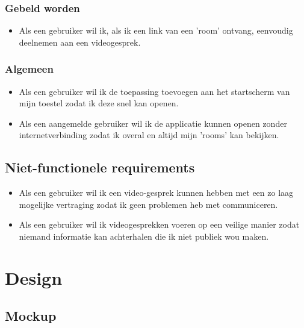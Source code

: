 	 	\subsubsection{Gebeld worden}
	 	 \begin{itemize}
				\item Als een gebruiker wil ik, als ik een link van een 'room' ontvang, eenvoudig deelnemen aan een videogesprek.
	 	 \end{itemize}
	
		\subsubsection{Algemeen}
	 		\begin{itemize}
	 			\item Als een gebruiker wil ik de toepassing toevoegen aan het startscherm van mijn toestel zodat ik deze snel kan openen.
	 			\item Als een aangemelde gebruiker wil ik de applicatie kunnen openen zonder internetverbinding zodat ik overal en altijd mijn 'rooms' kan bekijken.
			\end{itemize}
	 
	\subsection{Niet-functionele requirements}
		\begin{itemize}
			\item Als een gebruiker wil ik een video-gesprek kunnen hebben met een zo laag mogelijke vertraging zodat ik geen problemen heb met communiceren.
			\item Als een gebruiker wil ik videogesprekken voeren op een veilige manier zodat niemand informatie kan achterhalen die ik niet publiek wou maken.
		\end{itemize} 
		


\section{Design}
		\subsection{Mockup}
					
